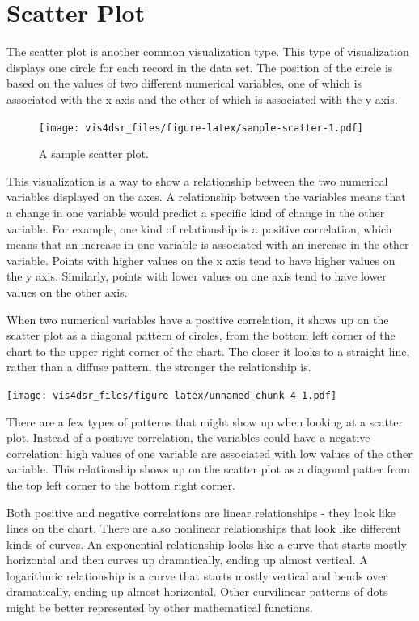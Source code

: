 \documentclass[
]{krantz}
\begin{document}
\hypertarget{scatter-plot}{%
\section{Scatter Plot}\label{scatter-plot}}

The scatter plot is another common visualization type. This type of visualization
displays one circle for each record in the data set. The position of the circle is
based on the values of two different numerical variables, one of which is associated
with the x axis and the other of which is associated with the y axis.

\begin{figure}
\centering
\texttt{[image: vis4dsr\_files/figure-latex/sample-scatter-1.pdf]}
\caption{\label{fig:sample-scatter}A sample scatter plot.}
\end{figure}

This visualization is a way to show a relationship between the two numerical variables
displayed on the axes. A relationship between the variables means that a change in one
variable would predict a specific kind of change in the other variable. For example,
one kind of relationship is a positive correlation, which means that an increase in
one variable is associated with an increase in the other variable. Points with higher
values on the x axis tend to have higher values on the y axis. Similarly, points
with lower values on one axis tend to have lower values on the other axis.

When two numerical variables have a positive correlation, it shows up on the scatter
plot as a diagonal pattern of circles, from the bottom left corner of the chart to
the upper right corner of the chart. The closer it looks to a straight line, rather
than a diffuse pattern, the stronger the relationship is.

\texttt{[image: vis4dsr\_files/figure-latex/unnamed-chunk-4-1.pdf]}

There are a few types of patterns that might show up when looking at a scatter plot.
Instead of a positive correlation, the variables could have a negative correlation:
high values of one variable are associated with low values of the other variable. This
relationship shows up on the scatter plot as a diagonal patter from the top left
corner to the bottom right corner.

Both positive and negative correlations are linear relationships - they look like
lines on the chart. There are also nonlinear relationships that look like different
kinds of curves. An exponential relationship looks like a curve that starts
mostly horizontal and then curves up dramatically, ending up almost vertical.
A logarithmic relationship is a curve that starts mostly vertical and bends
over dramatically, ending up almost horizontal. Other curvilinear patterns of dots
might be better represented by other mathematical functions.
\end{document}
